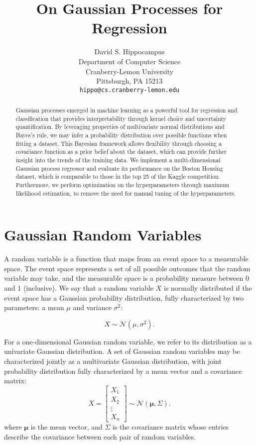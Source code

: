 \documentclass{article}
\title{On Gaussian Processes for Regression}
\author{
  David S. Hippocampus \\
  Department of Computer Science\\
  Cranberry-Lemon University\\
  Pittsburgh, PA 15213 \\
  \texttt{hippo@cs.cranberry-lemon.edu} \\
}
\begin{document}
\maketitle

\begin{abstract}
Gaussian processes emerged in machine learning as a powerful tool for regression and classification that provides interpretability through kernel choice and uncertainty quantification. By leveraging properties of multivariate normal distributions and Bayes’s rule, we may infer a probability distribution over possible functions when fitting a dataset. This Bayesian framework allows flexibility through choosing a covariance function as a prior belief about the dataset, which can provide further insight into the trends of the training data. We implement a multi-dimensional Gaussian process regressor and evaluate its performance on the Boston Housing dataset, which is comparable to those in the top 25 of the Kaggle competition. Furthermore, we perform optimization on the hyperparameters through maximum likelihood estimation, to remove the need for manual tuning of the hyperparameters.
\end{abstract}

\section{Gaussian Random Variables}
A random variable is a function that maps from an event space to a measurable space. The event space represents a set of all possible outcomes that the random variable may take, and the measurable space is a probability measure between 0 and 1 (inclusive). We say that a random variable $X$ is normally distributed if the event space has a Gaussian probability distribution, fully characterized by two parameters: a mean $\mu$ and variance $\sigma^2$:

\[X\sim \mathcal{N}(\mu,\sigma^2).\]

For a one-dimensional Gaussian random variable, we refer to its distribution as a univariate Gaussian distribution. A set of Gaussian random variables may be characterized jointly as a multivariate Gaussian distribution, with joint probability distribution fully characterized by a mean vector and a covariance matrix:
\[X = \begin{bmatrix}
           X_{1} \\
           X_{2} \\
           \vdots \\
           X_{n}
         \end{bmatrix}   \sim \mathcal{N}(\boldsymbol{\mu},\Sigma). \]
where $\boldsymbol{\mu}$ is the mean vector, and $\Sigma$ is the covariance matrix whose entries describe the covariance between each pair of random variables.
\end{document}
